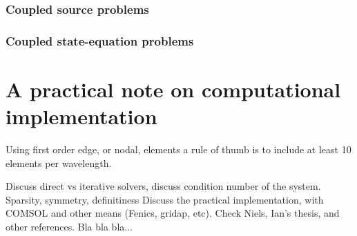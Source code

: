 \subsubsection*{Coupled source problems}

\subsubsection*{Coupled state-equation problems}


\section{A practical note on computational implementation}

Using first order edge, or nodal, elements a rule of thumb is to include at least 10 elements per wavelength.

Discuss direct vs iterative solvers, discuss condition number of the system.
Sparsity, symmetry, definitiness
Discuss the practical implementation, with COMSOL and other means (Fenics, gridap, etc).
Check Niels, Ian's thesis, and other references.
Bla bla bla...